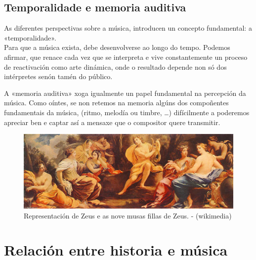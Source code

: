 \documentclass[a4paper, twoside]{templates/ociamthesis}
\begin{document}
\hypertarget{temporalidade-e-memoria-auditiva}{%
\subsection*{Temporalidade e memoria auditiva}\label{temporalidade-e-memoria-auditiva}}

As diferentes perspectivas sobre a música, introducen un concepto fundamental: a «temporalidade».\\
Para que a música exista, debe desenvolverse ao longo do tempo. Podemos afirmar, que renace cada vez que se interpreta e vive constantemente un proceso de reactivación como arte dinámica, onde o resultado depende non só dos intérpretes senón tamén do público.

A «memoria auditiva» xoga igualmente un papel fundamental na percepción da música. Como oíntes, se non retemos na memoria algúns dos compoñentes fundamentais da música, (ritmo, melodía ou timbre, \ldots) difícilmente a poderemos apreciar ben e captar así a mensaxe que o compositor quere transmitir.

\begin{figure}[ht]

{\centering \includegraphics[width=1\linewidth]{figures/ud-00/musas-origen-musica} 

}

\caption[Apolo e as nove musas inspiradoras das artes e as ciencias]{Representación de Zeus e as nove musas fillas de Zeus. - (wikimedia)}\label{fig:figura-musas-1}
\end{figure}

\hypertarget{relaciuxf3n-entre-historia-e-muxfasica}{%
\section*{Relación entre historia e música}\label{relaciuxf3n-entre-historia-e-muxfasica}}
\end{document}
